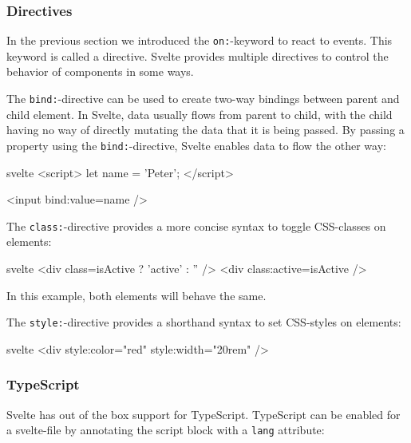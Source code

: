 \subsubsection{Directives}
\label{sec:svelte-directives}



In the previous section we introduced the \texttt{on:}-keyword to react to events. This keyword is called a directive. Svelte provides multiple directives to control the behavior of components in some ways.

The \texttt{bind:}-directive can be used to create two-way bindings between parent and child element. In Svelte, data usually flows from parent to child, with the child having no way of directly mutating the data that it is being passed. By passing a property using the \texttt{bind:}-directive, Svelte enables data to flow the other way:

\begin{myminted}{svelte}{}
<script>
  let name = 'Peter';
</script>

<input bind:value={name} />
\end{myminted}

The \texttt{class:}-directive provides a more concise syntax to toggle CSS-classes on elements:
\begin{myminted}{svelte}{}
<div class={isActive ? 'active' : ''} />
<div class:active={isActive} />
\end{myminted}
In this example, both elements will behave the same.

The \texttt{style:}-directive provides a shorthand syntax to set CSS-styles on elements:
\begin{myminted}{svelte}{}
<div style:color="red" style:width="20rem" />
\end{myminted}

\subsubsection{TypeScript}

Svelte has out of the box support for TypeScript. TypeScript can be enabled for a svelte-file by annotating the  script block with a \texttt{lang} attribute:

